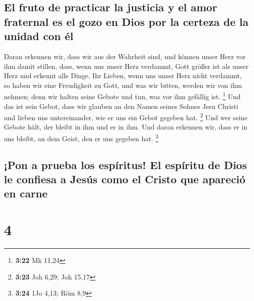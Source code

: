 \hypertarget{el-fruto-de-practicar-la-justicia-y-el-amor-fraternal-es-el-gozo-en-dios-por-la-certeza-de-la-unidad-con-uxe9l}{%
\subsection{El fruto de practicar la justicia y el amor fraternal es el
gozo en Dios por la certeza de la unidad con
él}\label{el-fruto-de-practicar-la-justicia-y-el-amor-fraternal-es-el-gozo-en-dios-por-la-certeza-de-la-unidad-con-uxe9l}}

 Daran erkennen wir, dass wir aus der Wahrheit sind, und
können unser Herz vor ihm damit stillen,  dass, wenn uns
unser Herz verdammt, Gott größer ist als unser Herz und erkennt alle
Dinge.  Ihr Lieben, wenn uns unser Herz nicht verdammt,
so haben wir eine Freudigkeit zu Gott,  und was wir
bitten, werden wir von ihm nehmen; denn wir halten seine Gebote und tun,
was vor ihm gefällig ist. \footnote{\textbf{3:22} Mk 11,24}
 Und das ist sein Gebot, dass wir glauben an den Namen
seines Sohnes Jesu Christi und lieben uns untereinander, wie er uns ein
Gebot gegeben hat. \footnote{\textbf{3:23} Joh 6,29; Joh 15,17}
 Und wer seine Gebote hält, der bleibt in ihm und er in
ihm. Und daran erkennen wir, dass er in uns bleibt, an dem Geist, den er
uns gegeben hat. \footnote{\textbf{3:24} 1Jo 4,13; Röm 8,9}

\hypertarget{pon-a-prueba-los-espuxedritus-el-espuxedritu-de-dios-le-confiesa-a-jesuxfas-como-el-cristo-que-apareciuxf3-en-carne}{%
\subsection{¡Pon a prueba los espíritus! El espíritu de Dios le confiesa
a Jesús como el Cristo que apareció en
carne}\label{pon-a-prueba-los-espuxedritus-el-espuxedritu-de-dios-le-confiesa-a-jesuxfas-como-el-cristo-que-apareciuxf3-en-carne}}

\hypertarget{section-3}{%
\section{4}\label{section-3}}


